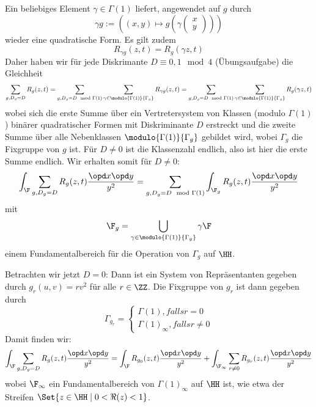 \begin{bewe}
Ein beliebiges Element $\gamma \in \Gamma(1)$ liefert, angewendet auf $g$ durch
\[
	\gamma g := \left( (x,y) \mapsto g(\gamma \begin{pmatrix}x\\y\end{pmatrix}) \right)
\]
wieder eine quadratische Form. Es gilt zudem
\[
	R_{\gamma g} (z, t) = R_g (\gamma z, t)
\]
Daher haben wir für jede Diskrimante $D \equiv 0, 1 \mod 4$ (Übungsaufgabe) die Gleichheit
\[
	\sum_{g, D_g = D} R_g (z, t) = \sum_{g, D_g = D \mod \Gamma(1)} \sum_{\gamma \in \modulo {\Gamma(1)} {\Gamma_g}} R_{\gamma g} (z,t) = \sum_{g, D_g = D \mod \Gamma(1)} \sum_{\gamma \in \modulo {\Gamma(1)} {\Gamma_g}} R_g (\gamma z,t)
\]
wobei sich die erste Summe über ein Vertretersystem von Klassen (modulo $\Gamma(1)$) binärer quadratischer Formen mit Diskriminante $D$ erstreckt und die zweite Summe über alle Nebenklassen $\modulo {\Gamma(1)}{\Gamma_g}$ gebildet wird, wobei $\Gamma_g$ die Fixgruppe von $g$ ist. Für $D \neq 0$ ist die Klassenzahl endlich, also ist hier die erste Summe endlich. Wir erhalten somit für $D \neq 0$:
\[
	\int_\F \sum_{g, D_g = D} R_g(z,t) \frac{\opd x \opd y}{y^2} = \sum_{g, D_g = D \mod \Gamma(1)} \int_{\F_g} R_g (z,t) \frac{\opd x \opd y}{y^2}
\]
mit 
\[
	\F_g = \bigcup_{\gamma \in \modulo {\Gamma(1)}{\Gamma_g}} \gamma \F
\]
einem Fundamentalbereich für die Operation von $\Gamma_g$ auf $\HH$.

Betrachten wir jetzt $D = 0$: Dann ist ein System von Repräsentanten gegeben durch $g_r(u,v) = rv^2$ für alle $r \in \ZZ$. Die Fixgruppe von $g_r$ ist dann gegeben durch
\[
	\Gamma_{g_r} = \begin{cases} \Gamma(1), falls r = 0\\ \Gamma(1)_\infty, falls r \neq 0\end{cases}
\]
Damit finden wir:
\begin{align*}
\int_\F \sum_{g, D_g = D} R_g(z,t) \frac{\opd x \opd y}{y^2} = \int_\F R_{g_0} (z,t) \frac{\opd x \opd y}{y^2} + \int_{\F_\infty} \sum_{r \neq 0} R_{g_r}(z,t) \frac{\opd x \opd y}{y^2}
\end{align*}
wobei $\F_\infty$ ein Fundamentalbereich von $\Gamma(1)_\infty$ auf $\HH$ ist, wie etwa der Streifen $\Set {z \in \HH \mid 0 < \Re (z) < 1}$.

\end{bewe}